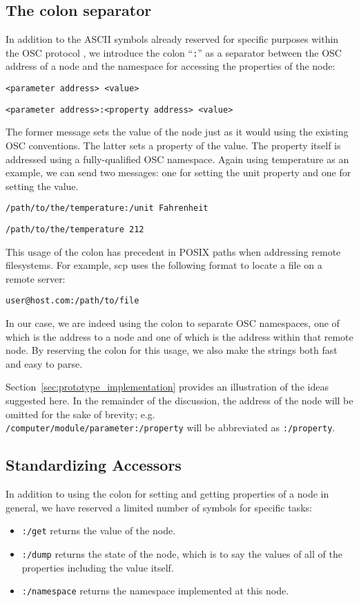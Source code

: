 \documentclass{NIME-alternate}
\begin{document}
\subsection{The colon separator}
\label{sub:the_colon_separator}

In addition to the ASCII symbols already reserved for specific purposes within the OSC protocol \cite{Wright:1997}, we introduce the colon ``\texttt{:}'' as a separator between the OSC address of a node and the namespace for accessing the properties of the node:

\texttt{<parameter address> <value>}

\texttt{<parameter address>:<property address> <value>}

The former message sets the value of the node just as it would using the existing OSC conventions. The latter sets a property of the value.  The property itself is addressed using a fully-qualified OSC namespace. Again using temperature as an example, we can send two messages: one for setting the unit property and one for setting the value.

\texttt{/path/to/the/temperature:/unit Fahrenheit}

\texttt{/path/to/the/temperature 212}

This usage of the colon has precedent in POSIX paths when addressing remote filesystems.  For example, scp uses the following format to locate a file on a remote server:

\texttt{user@host.com:/path/to/file}

In our case, we are indeed using the colon to separate OSC namespaces, one of which is the address to a node and one of which is the address within that remote node.  By reserving the colon for this usage, we also make the strings both fast and easy to parse.

Section~\ref{sec:prototype_implementation} provides an illustration of the ideas suggested here. In the remainder of the discussion, the address of the node will be omitted for the sake of brevity; e.g.\\ 
\texttt{/computer/module/parameter:/property}  
will be abbreviated as \texttt{:/property}.



\subsection{Standardizing Accessors}

In addition to using the colon for setting and getting properties of a node in general, we have reserved a limited number of symbols for specific tasks:
\begin{itemize}
	\item \texttt{:/get} returns the value of the node.
	\item \texttt{:/dump} returns the state of the node, which is to say the values of all of the properties including the value itself.
	\item \texttt{:/namespace} returns the namespace implemented at this node.
\end{itemize}
\end{document}
